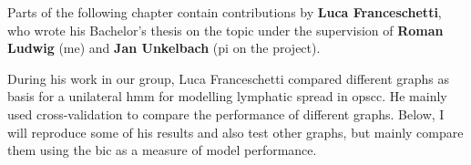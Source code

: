 \begin{tcolorbox}[title=\faIcon{users} Contributions, parbox=false]
    Parts of the following chapter contain contributions by  \textbf{Luca Franceschetti}, who wrote his Bachelor's thesis \cite{franceschetti_comparison_2022} on the topic under the supervision of  \textbf{Roman Ludwig} (me) and  \textbf{Jan Unkelbach} (\gls{pi} on the project).

    During his work in our group, Luca Franceschetti compared different graphs as basis for a unilateral \gls{hmm} for modelling lymphatic spread in \gls{opscc}. He mainly used cross-validation to compare the performance of different graphs. Below, I will reproduce some of his results and also test other graphs, but mainly compare them using the \gls{bic} as a measure of model performance.
\end{tcolorbox}

